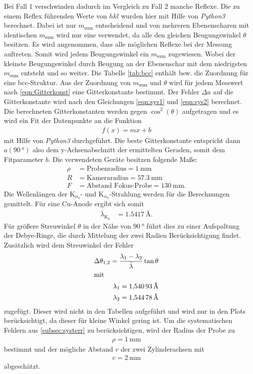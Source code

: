Bei Fall 1 verschwinden dadurch im Vergleich zu Fall 2 manche
Reflexe.
Die zu einem Reflex führenden Werte von $hkl$ wurden hier mit Hilfe von
\textit{Python3} berechnet. Dabei ist nur $m_{\mathrm{sum}}$ entscheidend
und von mehreren Ebenenscharen mit identischen $m_{\mathrm{sum}}$ wird nur eine verwendet,
da alle den gleichen Beugungswinkel $\theta$ besitzen.
Es wird angenommen, dass alle möglichen Reflexe bei der Messung auftreten.
Somit wird jedem Beugungswinkel \theta ein $m_{\mathrm{sum}}$ zugewiesen.
Wobei der kleinste Beugungswinkel durch Beugung an der
Ebenenschar mit dem niedrigsten $m_{\mathrm{sum}}$ entsteht und so weiter.
Die Tabelle \ref{tab:bcc} enthält bsw. die Zuordnung für eine bcc-Struktur.
Aus der Zuordnung von $m_{\mathrm{sum}}$ und $\theta$
wird für jedem Messwert nach \eqref{eqn:Gitterkonst}
eine Gitterkonstante bestimmt. Der Fehler $\Delta a$
auf die Gitterkonstante
wird nach den Gleichungen \eqref{eqn:sys1} und \eqref{eqn:sys2}
berechnet. Die berechneten Gitterkonstanten werden
gegen $\cos^2\left(\theta\right)$ aufgetragen und es wird
ein Fit der Datenpunkte an die Funktion
\begin{align}
  f(x)= mx+b
\end{align}
mit Hilfe von \textit{Python3} durchgeführt.
Die beste Gitterkonstante entspricht dann $a(\SI{90}{\degree})$
also dem y-Achsenabschnitt der ermittelten Geraden, somit dem Fitparameter $b$.
Die verwendeten Geräte besitzen folgende Maße:
\begin{align*}
  \rho &= \text{Probenradius} = \SI{1}{\milli\meter}\\
  R &= \text{Kameraradius} = \SI{57.3}{\milli\meter}\\
  F &= \text{Abstand Fokus-Probe} = \SI{130}{\milli\meter}.
\end{align*}
Die Wellenlängen der
$\mathrm{K}_{\alpha_1}$-
und $\mathrm{K}_{\alpha_2}$-Strahlung
werden für die Berechnungen gemittelt.
Für eine Cu-Anode ergibt sich somit
\begin{align*}
  \bar{\lambda}_{\mathrm{K}_\alpha} &= \SI{1,5417}{\angstrom}.
\end{align*}
Für größere Streuwinkel $\theta$ in der
Nähe von $\SI{90}{\degree}$
führt dies zu einer Aufspaltung
der Debye-Ringe, die durch Mittelung der zwei Radien
Berücksichtigung findet. Zusätzlich
wird dem Streuwinkel \theta der Fehler
\begin{align*}
  \Delta\theta_{1,2} = \frac{\lambda_1 - \lambda_2}{\bar{\lambda}}\tan\theta\\
\intertext{mit}
 \lambda_1=\SI{1,54093}{\angstrom}\\
 \lambda_2=\SI{1,54478}{\angstrom}
\end{align*}
zugefügt. Dieser wird nicht in den Tabellen aufgeführt
und wird nur in den Plots berücksichtigt, da dieser für kleine Winkel gering ist.
Um die systematischen Fehlern aus \ref{subsec:systerr}
zu berücksichtigen, wird der Radius der Probe zu
\begin{align*}
\rho = \SI{1}{\milli\meter}
\end{align*}
bestimmt und der mögliche Abstand $v$
der zwei Zylinderachsen
mit \begin{align*}
v = \SI{2}{\milli\meter}
\end{align*}
abgeschätzt.
\newpage
